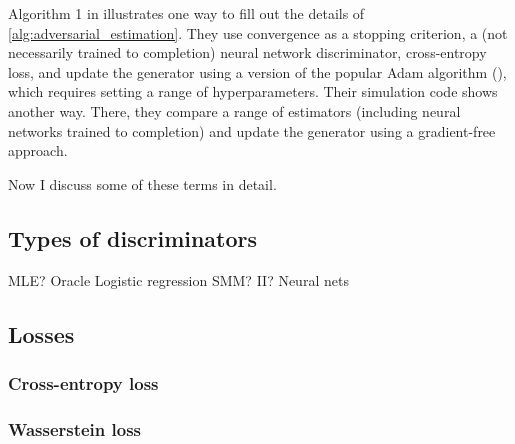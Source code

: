Algorithm 1 in \textcite{kaji2023adversarial} illustrates one way to fill out the details of \ref{alg:adversarial_estimation}.
They use convergence as a stopping criterion, a (not necessarily trained to completion) neural network discriminator, cross-entropy loss, and update the generator using a version of the popular Adam algorithm (\cite{diederik2014adam}), which requires setting a range of hyperparameters.
Their simulation code shows another way. %
There, they compare a range of estimators (including neural networks trained to completion) and update the generator using a gradient-free approach.

Now I discuss some of these terms in detail.

\subsection{Types of discriminators}
\label{sec:discriminators}

MLE?
Oracle
Logistic regression
SMM? II?
Neural nets

\subsection{Losses}
\label{sec:losses}

\subsubsection{Cross-entropy loss}
\label{sec:ce_loss}

\subsubsection{Wasserstein loss}
\label{sec:wasserstein_loss}